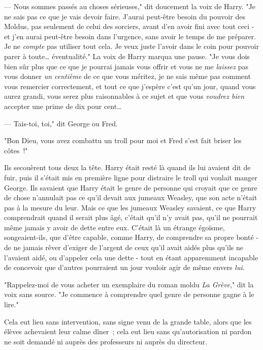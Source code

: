 --- Nous sommes passés au choses sérieuses," dit doucement la voix de Harry. "Je ne sais pas ce que je vais devoir faire. J'aurai peut-être besoin du pouvoir des Moldus, pas seulement de celui des sorciers, avant d'en avoir fini avec tout ceci - et j'en aurai peut-être besoin dans l'urgence, sans avoir le temps de me préparer. Je ne \emph{compte} pas utiliser tout cela. Je veux juste l'avoir dans le coin pour pouvoir parer à toute… éventualité." La voix de Harry marqua une pause. "Je vous dois bien sûr plus que ce que je pourrai jamais vous offrir et vous ne me \emph{laissez} pas vous donner \emph{un centième} de ce que vous méritez, je ne sais même pas comment vous remercier correctement, et tout ce que j'espère c'est qu'un jour, quand vous aurez grandi, vous serez plus raisonnables à ce sujet et que vous \emph{voudrez bien} accepter une prime de dix pour cent…

--- Tais-toi, toi," dit George ou Fred.

"Bon Dieu, vous avez combattu un troll pour moi et Fred s'est fait briser les côtes~!"

Ils secouèrent tous deux la tête. Harry était resté là quand ils lui avaient dit de fuir, puis il s'était mis en première ligne pour distraire le troll qui voulait manger George. Ils savaient que Harry était le genre de personne qui croyait que ce genre de chose n'annulait pas ce qu'il devait aux jumeaux Weasley, que son acte n'était pas à la mesure du leur. Mais ce que les jumeaux Weasley savaient, ce que Harry comprendrait quand il serait plus âgé, c'était qu'il n'y avait pas, qu'il ne pourrait même jamais y avoir de dette entre eux. C'était là un étrange égoïsme, songeaient-ils, que d'être capable, comme Harry, de comprendre sa propre bonté - de ne jamais rêver d'exiger de l'argent de ceux qu'il avait aidés plus qu'ils ne l'avaient aidé, ou d'appeler cela une dette - tout en étant apparemment incapable de concevoir que d'autres pourraient un jour vouloir agir de même envers \emph{lui}.

"Rappelez-moi de vous acheter un exemplaire du roman moldu \emph{La Grève}," dit la voix sans source. "Je commence à comprendre quel genre de personne gagne à le lire."


Cela eut lieu sans intervention, sans signe venu de la grande table, alors que les élèves achevaient leur calme dîner~; cela eut lieu sans qu'autorisation ni pardon ne soit demandé ni auprès des professeurs ni auprès du directeur.

